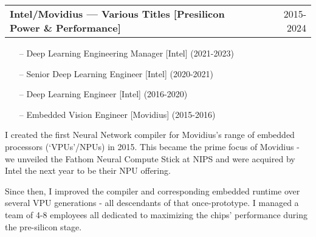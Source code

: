 \documentclass[a4paper,12pt]{article}
\makeatletter
\newenvironment{jobshort}[2]
    {
    \begin{tabularx}{\linewidth}{@{}l X r@{}}
    \textbf{#1} & \hfill &  #2 \\[3.75pt]
    \end{tabularx}
    }
    {
    }
\makeatother
\begin{document}
\begin{jobshort}{Intel/Movidius --- Various Titles [Presilicon Power \& Performance]}{2015-2024}

\vspace{-15pt}
\begin{itemize}[noitemsep,topsep=0pt,parsep=0pt,partopsep=0pt]
    \item[--] Deep Learning Engineering Manager [Intel] (2021-2023)
    \item[--] Senior Deep Learning Engineer [Intel] (2020-2021)
    \item[--] Deep Learning Engineer [Intel] (2016-2020)
    \item[--] Embedded Vision Engineer [Movidius] (2015-2016)
\end{itemize}

I created the first Neural Network compiler for Movidius's range of embedded processors (‘VPUs’/NPUs) in 2015. This became the prime focus of Movidius - we unveiled the Fathom Neural Compute Stick at NIPS and were acquired by Intel the next year to be their NPU offering.

Since then, I improved the compiler and corresponding embedded runtime over several VPU generations - all descendants of that once-prototype. I managed a team of 4-8 employees all dedicated to maximizing the chips' performance during the pre-silicon stage.


\end{jobshort}
\end{document}
